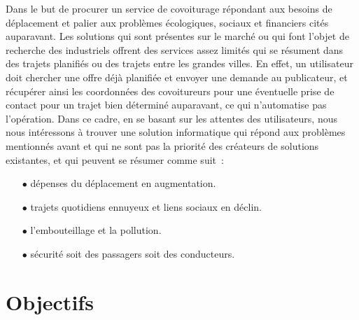 Dans le but de procurer un service de covoiturage répondant aux besoins de déplacement et palier aux problèmes écologiques, sociaux et financiers cités auparavant.\newline
Les solutions qui sont présentes sur le marché ou qui font l'objet de recherche des industriels offrent des services assez limités qui se résument dans des trajets planifiés ou des trajets entre les grandes villes.\newline
En effet, un utilisateur doit chercher une offre déjà planifiée et envoyer une demande au publicateur, et récupérer ainsi les coordonnées des covoitureurs pour une éventuelle prise de contact pour un trajet bien déterminé auparavant, ce qui n'automatise pas l’opération.\newline
Dans ce cadre, en se basant sur les attentes des utilisateurs, nous nous intéressons à trouver une solution informatique qui répond aux problèmes mentionnés avant et qui ne sont pas la priorité des créateurs de solutions existantes, et qui peuvent se résumer comme suit :
\begin{itemize}
\item[$\bullet$] dépenses du déplacement en augmentation.
\item[$\bullet$] trajets quotidiens ennuyeux et liens sociaux en déclin.
\item[$\bullet$] l'embouteillage et la pollution.
\item[$\bullet$] sécurité soit des passagers soit des conducteurs.
\end{itemize}

\section{Objectifs}

